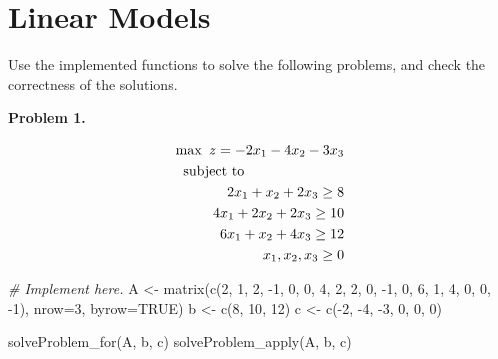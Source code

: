 \documentclass[
]{article}
\newenvironment{Shaded}{\begin{snugshade}}{\end{snugshade}}
\newcommand{\AttributeTok}[1]{\textcolor[rgb]{0.77,0.63,0.00}{#1}}
\newcommand{\CommentTok}[1]{\textcolor[rgb]{0.56,0.35,0.01}{\textit{#1}}}
\newcommand{\ConstantTok}[1]{\textcolor[rgb]{0.00,0.00,0.00}{#1}}
\newcommand{\DecValTok}[1]{\textcolor[rgb]{0.00,0.00,0.81}{#1}}
\newcommand{\FunctionTok}[1]{\textcolor[rgb]{0.00,0.00,0.00}{#1}}
\newcommand{\NormalTok}[1]{#1}
\newcommand{\OtherTok}[1]{\textcolor[rgb]{0.56,0.35,0.01}{#1}}
\newcommand{\SpecialCharTok}[1]{\textcolor[rgb]{0.00,0.00,0.00}{#1}}
\begin{document}
\hypertarget{linear-models}{%
\section{Linear Models}\label{linear-models}}

Use the implemented functions to solve the following problems, and check
the correctness of the solutions.

\textbf{Problem 1.}

\vspace{-0.5cm}

\begin{eqnarray*}
\max\ z=-2x_{1}-4x_{2}-3x_3 \\
     \mbox{subject to}\hspace{2.5cm}\\
      2x_{1}+x_{2}+2x_3\geq 8\\
      4x_{1}+2x_{2}+2x_3\geq 10\\
      6x_{1}+x_{2}+4x_3\geq 12\\
      x_{1},x_{2},x_3\geq 0\\
\end{eqnarray*}

\vspace{-0.5cm}

\begin{Shaded}
\begin{Highlighting}[]
\CommentTok{\# Implement here. }
\NormalTok{A }\OtherTok{\textless{}{-}} \FunctionTok{matrix}\NormalTok{(}\FunctionTok{c}\NormalTok{(}\DecValTok{2}\NormalTok{, }\DecValTok{1}\NormalTok{, }\DecValTok{2}\NormalTok{, }\SpecialCharTok{{-}}\DecValTok{1}\NormalTok{, }\DecValTok{0}\NormalTok{, }\DecValTok{0}\NormalTok{, }\DecValTok{4}\NormalTok{, }\DecValTok{2}\NormalTok{, }\DecValTok{2}\NormalTok{, }\DecValTok{0}\NormalTok{, }\SpecialCharTok{{-}}\DecValTok{1}\NormalTok{, }\DecValTok{0}\NormalTok{, }\DecValTok{6}\NormalTok{, }\DecValTok{1}\NormalTok{, }\DecValTok{4}\NormalTok{, }\DecValTok{0}\NormalTok{, }\DecValTok{0}\NormalTok{, }\SpecialCharTok{{-}}\DecValTok{1}\NormalTok{), }\AttributeTok{nrow=}\DecValTok{3}\NormalTok{, }\AttributeTok{byrow=}\ConstantTok{TRUE}\NormalTok{)}
\NormalTok{b }\OtherTok{\textless{}{-}} \FunctionTok{c}\NormalTok{(}\DecValTok{8}\NormalTok{, }\DecValTok{10}\NormalTok{, }\DecValTok{12}\NormalTok{)}
\NormalTok{c }\OtherTok{\textless{}{-}} \FunctionTok{c}\NormalTok{(}\SpecialCharTok{{-}}\DecValTok{2}\NormalTok{, }\SpecialCharTok{{-}}\DecValTok{4}\NormalTok{, }\SpecialCharTok{{-}}\DecValTok{3}\NormalTok{, }\DecValTok{0}\NormalTok{, }\DecValTok{0}\NormalTok{, }\DecValTok{0}\NormalTok{)}

\FunctionTok{solveProblem\_for}\NormalTok{(A, b, c)}
\FunctionTok{solveProblem\_apply}\NormalTok{(A, b, c)}
\end{Highlighting}
\end{Shaded}
\end{document}
